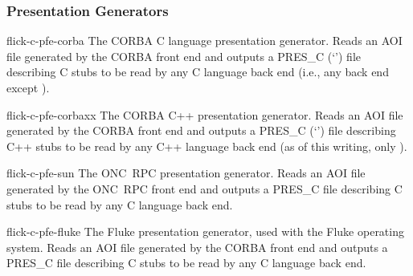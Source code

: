 \subsubsection{Presentation Generators}
\begin{commandlist}
  \item[flick-c-pfe-corba] The CORBA C language presentation generator.  Reads
  an AOI file generated by the CORBA front end and outputs a PRES\_C
  (`') file describing C stubs to be read by any C language back
  end (i.e., any back end except ).

  \item[flick-c-pfe-corbaxx] The CORBA C++ presentation generator.  Reads an
  AOI file generated by the CORBA front end and outputs a PRES\_C
  (`') file describing C++ stubs to be read by any C++ language
  back end (as of this writing, only ).

  \item[flick-c-pfe-sun] The ONC~RPC presentation generator.  Reads an AOI file
  generated by the ONC~RPC front end and outputs a PRES\_C file describing C
  stubs to be read by any C language back end.

  \item[flick-c-pfe-fluke] The Fluke presentation generator, used with the
  Fluke operating system.  Reads an AOI file generated by the CORBA front end
  and outputs a PRES\_C file describing C stubs to be read by any C language
  back end.
\end{commandlist}

